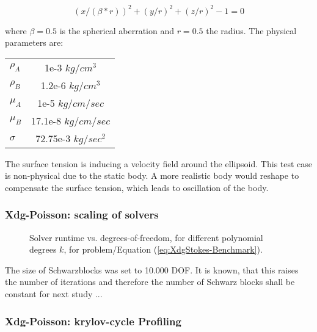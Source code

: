 \begin{equation}
(x/(\beta*r))^2 + (y/r)^2 +(z/r)^2-1=0
\end{equation} 

where $\beta=0.5$ is the spherical aberration and $r=0.5$ the radius. The physical parameters are:

\begin{table}[h]
	\centering
	\begin{tabular}{l|c}
		$\rho_A$ & 1e-3  $kg / cm^3$\\
		$\rho_B$ & 1.2e-6  $kg / cm^3$\\
		$\mu_A$ & 1e-5 $kg / cm / sec$\\
		$\mu_B$ & 17.1e-8 $kg / cm / sec$\\
		$\sigma$ & 72.75e-3 $kg / sec^2$\\
	\end{tabular}
\end{table}

The surface tension is inducing a velocity field around the ellipsoid. This test case is non-physical due to the static body. A more realistic body would reshape to compensate the surface tension, which leads to oscillation of the body.

\graphicspath{{./apdx-NodeSolverPerformance/XDGStokes/plots/}}

\subsubsection{Xdg-Poisson: scaling of solvers}

\begin{figure}[!h]
	\begin{center}
		
	\end{center}
	\caption{
		Solver runtime vs. degrees-of-freedom, for different polynomial degrees $k$,
		for problem/Equation (\ref{eq:XdgStokes-Benchmark}).
	}
	\label{fig:XdgStokes-scaling}
\end{figure}

The size of Schwarzblocks was set to 10.000 DOF. It is known, that this raises the number of iterations and therefore the number of Schwarz blocks shall be constant for next study ... 

\newpage

\subsubsection{Xdg-Poisson: krylov-cycle Profiling}


